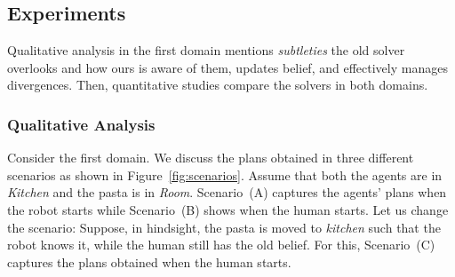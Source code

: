 \documentclass[letterpaper]{article} %
\begin{document}
\subsection{Experiments}
Qualitative analysis in the first domain mentions \textit{subtleties} the old solver overlooks and how ours is aware of them, updates belief, and effectively manages divergences. 
Then, quantitative studies compare the solvers in both domains.


\subsubsection{Qualitative Analysis}
Consider the first domain. We discuss the plans obtained in three different scenarios as shown in Figure~\ref{fig:scenarios}. Assume that both the agents are in \textit{Kitchen} and the pasta is in \textit{Room}. Scenario~(A) captures the agents' plans when the robot starts while Scenario~(B) shows when the human starts. Let us change the scenario: Suppose, in hindsight, the pasta is moved to \textit{kitchen} such that the robot knows it, while the human still has the old belief. For this, Scenario~(C) captures the plans obtained when the human starts. 
\end{document}

